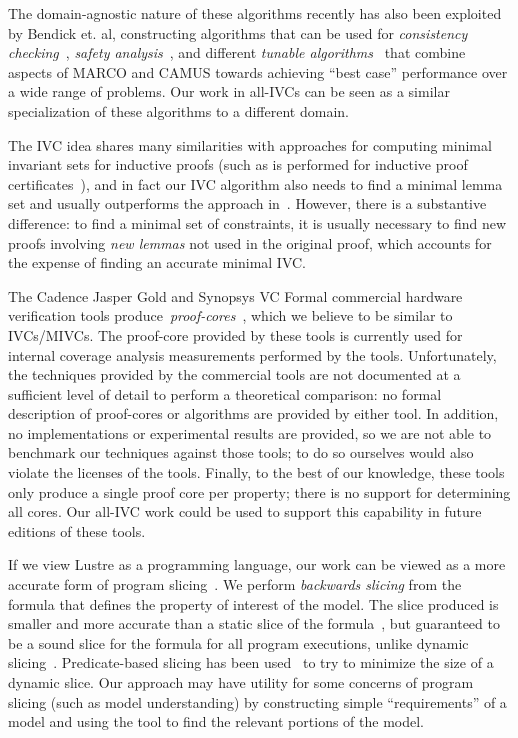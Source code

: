 The domain-agnostic nature of these algorithms recently has also been exploited by Bendick et. al, constructing algorithms that can be used for {\em consistency checking}~\cite{DBLP:conf/issta/Bendik17}, {\em safety analysis}~\cite{DBLP:conf/sefm/BendikBBC16}, and different {\em tunable algorithms}~\cite{DBLP:conf/fsttcs/BendikBCB16} that combine aspects of MARCO and CAMUS towards achieving ``best case'' performance over a wide range of problems.  Our work in all-IVCs can be seen as a similar specialization of these algorithms to a different domain.

The IVC idea shares many similarities with approaches for computing minimal invariant sets for inductive proofs (such as is performed for inductive proof certificates~\cite{piskac2016, Ivrii14:invariants}), and in fact our IVC algorithm also needs to find a minimal lemma set and usually outperforms the approach in~\cite{piskac2016}.  However, there is a substantive difference: to find a minimal set of constraints, it is usually necessary to find new proofs involving {\em new lemmas} not used in the original proof, which accounts for the expense of finding an accurate minimal IVC.  

The Cadence Jasper Gold and Synopsys VC Formal commercial hardware verification tools produce~\emph{proof-cores}~\cite{hanna2015formal, jasper_gold, Synopsys_VC_formal}, which we believe to be similar to IVCs/MIVCs.  The proof-core provided by these tools is currently used for internal coverage analysis measurements performed by the tools.  Unfortunately, the techniques provided by the commercial tools are not documented at a sufficient level of detail to perform a theoretical comparison:
no formal description of proof-cores or algorithms are provided by either tool. In addition, no implementations or experimental results are provided, so we are not able to benchmark our techniques against those tools; to do so ourselves would also violate the licenses of the tools.  Finally, to the best of our knowledge, these tools only produce a single proof core per property; there is no support for determining all cores. Our all-IVC work could be used to support this capability in future editions of these tools.

If we view Lustre as a programming language, our work can be viewed as a more accurate form of program slicing~\cite{Tip95asurvey}.  We perform {\em backwards slicing} from the formula that defines the property of interest of the model.  The slice produced is smaller and more accurate than a static slice of the formula~\cite{Weiser:1981:slicing}, but guaranteed to be a sound slice for the formula for all program executions, unlike dynamic slicing~\cite{Agrawal:1990:slicing}.  Predicate-based slicing has been used~\cite{Li04:slicing} to try to minimize the size of a dynamic slice.  Our approach may have utility for some concerns of program slicing (such as model understanding) by constructing simple ``requirements'' of a model and using the tool to find the relevant portions of the model.

